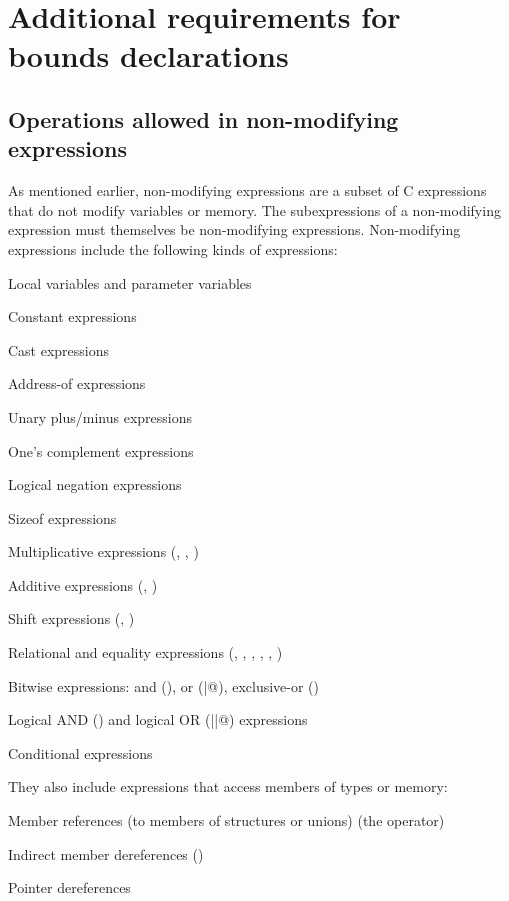 \section{Additional requirements for bounds declarations}

\subsection{Operations allowed in non-modifying expressions}
\label{section:non-modifying-expressions}

As mentioned earlier, non-modifying expressions are a subset of C
expressions that do not modify variables or memory. The subexpressions
of a non-modifying expression must themselves be non-modifying
expressions. Non-modifying expressions include the following kinds of
expressions:

\begin{compactitem}
\item
  Local variables and parameter variables
\item
  Constant expressions
\item
  Cast expressions
\item
  Address-of expressions
\item
  Unary plus/minus expressions
\item
  One's complement expressions
\item
  Logical negation expressions
\item
  Sizeof expressions
\item
  Multiplicative expressions (\code{*}, \code{/}, \code{\%})
\item
  Additive expressions (\code{+}, \code{-})
\item
  Shift expressions (\code{>>}, \code{<<})
\item
  Relational and equality expressions (\code{<}, \code{>},
  \code{<=}, \code{>=}, \code{==}, \code{!=})
\item
  Bitwise expressions: and (\code{&}), or (\lstinline@|@), exclusive-or (\code{^})
\item
  Logical AND (\code{&&}) and logical OR (\lstinline@||@) expressions
\item
  Conditional expressions
\end{compactitem}

They also include expressions that access members of types or memory:

\begin{compactitem}
\item
  Member references (to members of structures or unions) (the 
  operator)
\item
  Indirect member dereferences (\code{->})
\item
  Pointer dereferences
\end{compactitem}

